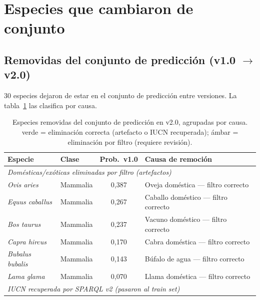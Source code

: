 \documentclass[12pt,a4paper]{article}
\begin{document}
\section{Especies que cambiaron de conjunto}

\subsection{Removidas del conjunto de predicción (v1.0 $\to$ v2.0)}

30 especies dejaron de estar en el conjunto de predicción entre versiones.
La tabla~\ref{tab:removidas} las clasifica por causa.

\begin{table}[H]
  \centering\small
  \caption{Especies removidas del conjunto de predicción en v2.0, agrupadas por causa.
           \colorbox{verdeClaro}{\footnotesize verde} = eliminación correcta (artefacto o IUCN recuperada);
           \colorbox{ambarClaro}{\footnotesize ámbar} = eliminación por filtro (requiere revisión).}
  \label{tab:removidas}
  \begin{tabular}{p{4.5cm}lcp{4.5cm}}
    \toprule
    \textbf{Especie} & \textbf{Clase} & \textbf{Prob.\ v1.0} & \textbf{Causa de remoción} \\
    \midrule
    \multicolumn{4}{l}{\textit{Domésticas/exóticas eliminadas por filtro (artefactos)}} \\
    \rowcolor{verdeClaro}\textit{Ovis aries}      & Mammalia & 0,387 & Oveja doméstica --- filtro correcto \\
    \rowcolor{verdeClaro}\textit{Equus caballus}  & Mammalia & 0,267 & Caballo doméstico --- filtro correcto \\
    \rowcolor{verdeClaro}\textit{Bos taurus}      & Mammalia & 0,237 & Vacuno doméstico --- filtro correcto \\
    \rowcolor{verdeClaro}\textit{Capra hircus}    & Mammalia & 0,170 & Cabra doméstica --- filtro correcto \\
    \rowcolor{verdeClaro}\textit{Bubalus bubalis} & Mammalia & 0,143 & Búfalo de agua --- filtro correcto \\
    \rowcolor{verdeClaro}\textit{Lama glama}      & Mammalia & 0,070 & Llama doméstica --- filtro correcto \\
    \midrule
    \multicolumn{4}{l}{\textit{IUCN recuperada por SPARQL v2 (pasaron al train set)}} \\

\end{tabular}
\end{table}
\end{document}
